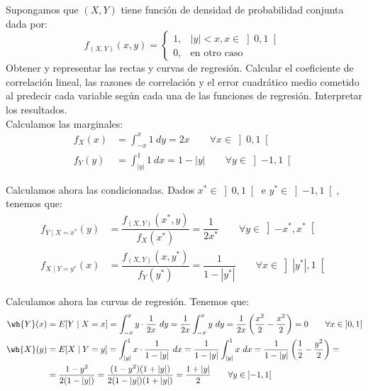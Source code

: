 \begin{ejercicio}
    Supongamos que $(X,Y)$ tiene función de densidad de probabilidad conjunta dada por:
    \begin{equation*}
        f_{(X,Y)}(x, y) = \begin{cases}
            1, & |y| < x, x \in \left]0,1\right[\\
            0, & \text{en otro caso}
        \end{cases}
    \end{equation*}
    Obtener y representar las rectas y curvas de regresión. Calcular el coeficiente de correlación lineal, las razones de correlación y el error cuadrático medio cometido al predecir cada variable según cada una de las funciones de regresión. Interpretar los resultados.\\

    Calculamos las marginales:
    \begin{align*}
        f_X(x) &= \int_{-x}^{x} 1 \ dy = 2x \qquad \forall x\in\left]0,1\right[\\
        f_Y(y) &= \int_{|y|}^{1} 1 \ dx = 1-|y| \qquad \forall y\in\left]-1,1\right[
    \end{align*}

    Calculamos ahora las condicionadas. Dados $x^*\in \left]0,1\right[$ e $y^*\in\left]-1,1\right[$, tenemos que:
    \begin{align*}
        f_{Y\mid X=x^*}(y) &= \dfrac{f_{(X,Y)}(x^*, y)}{f_X(x^*)} = \dfrac{1}{2x^*} \qquad \forall y\in\left]-x^*, x^*\right[\\
        f_{X\mid Y=y^*}(x) &= \dfrac{f_{(X,Y)}(x, y^*)}{f_Y(y^*)} = \dfrac{1}{1-|y^*|} \qquad \forall x\in\left]|y^*|,1\right[
    \end{align*}

    Calculamos ahora las curvas de regresión. Tenemos que:
    \begin{align*}
        \wh{Y}(x) &= E[Y\mid X=x] = \int_{-x}^{x} y\cdot \dfrac{1}{2x} \ dy = \dfrac{1}{2x}\int_{-x}^{x} y \ dy = \dfrac{1}{2x}\left(\dfrac{x^2}{2}-\dfrac{x^2}{2}\right) = 0 \qquad \forall x\in\left]0,1\right[\\
        \wh{X}(y) &= E[X\mid Y=y] = \int_{|y|}^{1} x\cdot \dfrac{1}{1-|y|} \ dx = \dfrac{1}{1-|y|}\int_{|y|}^{1} x \ dx = \dfrac{1}{1-|y|}\left(\dfrac{1}{2}-\dfrac{y^2}{2}\right)
        =\\&= \dfrac{1-y^2}{2(1-|y|)}
        = \dfrac{(1-y^2)(1+|y|)}{2(1-|y|)(1+|y|)}
        = \dfrac{1+|y|}{2} \qquad \forall y\in\left]-1,1\right[
    \end{align*}


\end{ejercicio}
